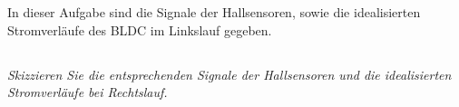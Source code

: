 
\chapter{}\label{ch:auf2}
In dieser Aufgabe sind die Signale der Hallsensoren, sowie die idealisierten Stromverläufe des BLDC im Linkslauf gegeben.

\section{}\label{sec:2a}
\textit{Skizzieren Sie die entsprechenden Signale der Hallsensoren und die idealisierten Stromverläufe bei Rechtslauf.}

\begin{figure}
	
\end{figure}
\begin{figure}
	
\end{figure}


\section{}\label{sec:2b}
\begin{figure}[htb]
	\centering
	
\end{figure}

\section{}\label{sec:2c}
\begin{figure}[htb]
	
\end{figure}

\section{}\label{sec:2d}
\begin{figure}[htb]
	
\end{figure}



\clearpage
